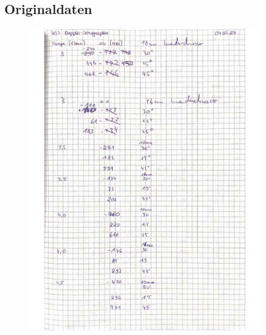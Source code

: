 \subsection{Originaldaten}
%
\begin{figure}[H]
  \centering
  \includegraphics[width=0.9\textwidth]{content/Messdaten/US3_1.pdf}
  \label{fig:Messungen_1}
\end{figure}
